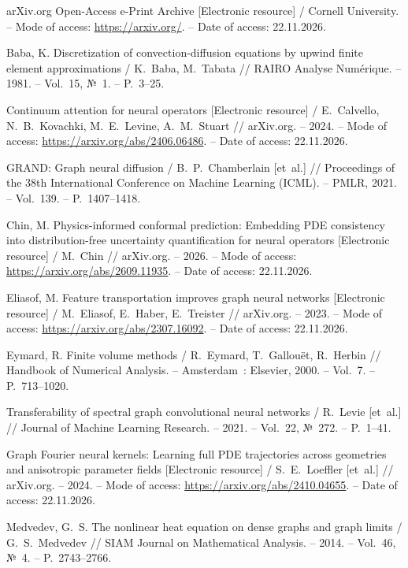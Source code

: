 {
arXiv.org Open-Access e-Print Archive [Electronic resource] / Cornell University. -- Mode of access: \url{https://arxiv.org/}. -- Date of access: 22.11.2026.

Baba, K. Discretization of convection-diffusion equations by upwind finite element approximations / K.~Baba, M.~Tabata // RAIRO Analyse Num\'erique. -- 1981. -- Vol.~15, №~1. -- P.~3--25.

Continuum attention for neural operators [Electronic resource] / E.~Calvello, N.~B.~Kovachki, M.~E.~Levine, A.~M.~Stuart // arXiv.org. -- 2024. -- Mode of access: \url{https://arxiv.org/abs/2406.06486}. -- Date of access: 22.11.2026.

GRAND: Graph neural diffusion / B.~P.~Chamberlain [et~al.] // Proceedings of the 38th International Conference on Machine Learning (ICML). -- PMLR, 2021. -- Vol.~139. -- P.~1407--1418.

Chin, M. Physics-informed conformal prediction: Embedding PDE consistency into distribution-free uncertainty quantification for neural operators [Electronic resource] / M.~Chin // arXiv.org. -- 2026. -- Mode of access: \url{https://arxiv.org/abs/2609.11935}. -- Date of access: 22.11.2026.

Eliasof, M. Feature transportation improves graph neural networks [Electronic resource] / M.~Eliasof, E.~Haber, E.~Treister // arXiv.org. -- 2023. -- Mode of access: \url{https://arxiv.org/abs/2307.16092}. -- Date of access: 22.11.2026.

Eymard, R. Finite volume methods / R.~Eymard, T.~Gallou\"et, R.~Herbin // Handbook of Numerical Analysis. -- Amsterdam~: Elsevier, 2000. -- Vol.~7. -- P.~713--1020.

Transferability of spectral graph convolutional neural networks / R.~Levie [et~al.] // Journal of Machine Learning Research. -- 2021. -- Vol.~22, №~272. -- P.~1--41.

Graph Fourier neural kernels: Learning full PDE trajectories across geometries and anisotropic parameter fields [Electronic resource] / S.~E.~Loeffler [et~al.] // arXiv.org. -- 2024. -- Mode of access: \url{https://arxiv.org/abs/2410.04655}. -- Date of access: 22.11.2026.

Medvedev, G.~S. The nonlinear heat equation on dense graphs and graph limits / G.~S.~Medvedev // SIAM Journal on Mathematical Analysis. -- 2014. -- Vol.~46, №~4. -- P.~2743--2766.

}
